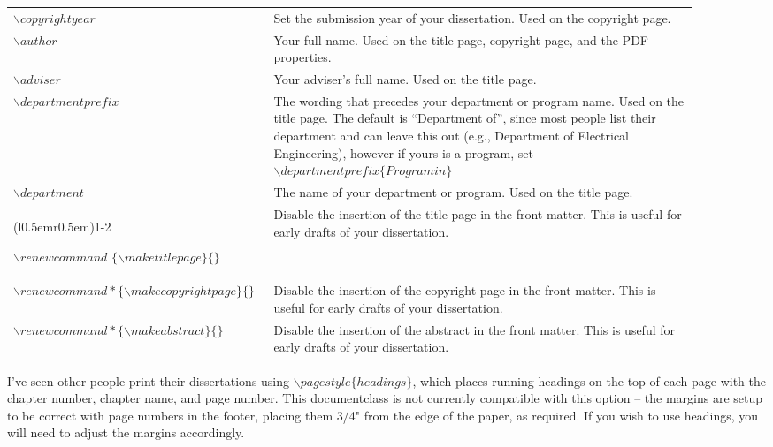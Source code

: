 \begin{longtable}{p{0.3\linewidth} p{0.6\linewidth}}
  $\backslash copyrightyear$ &
  Set the submission year of your dissertation. Used on the copyright page.
  \\

  $\backslash author$ &
  Your full name. Used on the title page, copyright page, and the PDF properties. \\

  $\backslash adviser$ &
  Your adviser's full name. Used on the title page. \\

  $\backslash departmentprefix$ &
  The wording that precedes your department or program name. Used on the title page. The default is ``Department of'', since most people list their department and can leave this out (e.g., Department of Electrical Engineering), however if yours is a program, set $\backslash departmentprefix\{Program in\}$ \\

  $\backslash department$ &
  The name of your department or program. Used on the title page. \\

  \cmidrule[0.1pt](l{0.5em}r{0.5em}){1-2}
  
  \raggedright  
  $\backslash renewcommand$ $\{\backslash maketitlepage\}\{\}$ &
  Disable the insertion of the title page in the front matter. This is useful for early drafts of your dissertation. \\

  \raggedright  %
  $\backslash renewcommand*\{\backslash makecopyrightpage\}\{\}$ &
  Disable the insertion of the copyright page in the front matter. This is useful for early drafts of your dissertation. \\

  \raggedright 
  $\backslash renewcommand*\{\backslash makeabstract\}\{\}$ &
  Disable the insertion of the abstract in the front matter. This is useful for early drafts of your dissertation. \\

\end{longtable}
\bodyspacing


I've seen other people print their dissertations using $\backslash pagestyle\{headings\}$, which places running headings on the top of each page with the chapter number, chapter name, and page number. This documentclass is not currently compatible with this option -- the margins are setup to be correct with page numbers in the footer, placing them 3/4" from the edge of the paper, as required. If you wish to use headings, you will need to adjust the margins accordingly.
